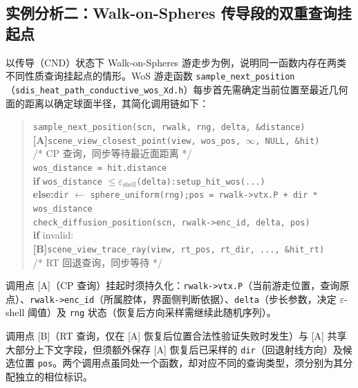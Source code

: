 \subsection{实例分析二：Walk-on-Spheres 传导段的双重查询挂起点}

以传导（CND）状态下 Walk-on-Spheres 游走步为例，说明同一函数内存在两类不同性质查询挂起点的情形。WoS 游走函数 \texttt{sample\_next\_position}（\texttt{sdis\_heat\_path\_conductive\_wos\_Xd.h}）每步首先需确定当前位置至最近几何面的距离以确定球面半径，其简化调用链如下：

\begin{quote}\small
\texttt{sample\_next\_position(scn, rwalk, rng, delta, \&distance)}\\
\hspace*{1.5em}\textbf{[A]}\;\texttt{scene\_view\_closest\_point(view,\,wos\_pos,\,$\infty$,\,NULL,\,\&hit)}\\
\hspace*{3em}/* CP 查询，同步等待最近面距离 */\\
\hspace*{1.5em}\texttt{wos\_distance = hit.distance}\\
\hspace*{1.5em}\textbf{if} \texttt{wos\_distance} $\leq\varepsilon_\text{shell}$\texttt{(delta):}\quad\texttt{setup\_hit\_wos(...)}\\
\hspace*{1.5em}\textbf{else:}\quad\texttt{dir} $\leftarrow$ \texttt{sphere\_uniform(rng);\quad pos = rwalk->vtx.P + dir * wos\_distance}\\
\hspace*{3em}\texttt{check\_diffusion\_position(scn, rwalk->enc\_id, delta, pos)}\\
\hspace*{3em}\textbf{if} invalid:\\
\hspace*{4.5em}\textbf{[B]}\;\texttt{scene\_view\_trace\_ray(view,\,rt\_pos,\,rt\_dir,\,...,\,\&hit\_rt)}\\
\hspace*{6em}/* RT 回退查询，同步等待 */
\end{quote}

调用点 [A]（CP 查询）挂起时须持久化：\texttt{rwalk->vtx.P}（当前游走位置，查询原点）、\texttt{rwalk->enc\_id}（所属腔体，界面侧判断依据）、\texttt{delta}（步长参数，决定 $\varepsilon$-shell 阈值）及 \texttt{rng} 状态（恢复后方向采样需继续此随机序列）。

调用点 [B]（RT 查询，仅在 [A] 恢复后位置合法性验证失败时发生）与 [A] 共享大部分上下文字段，但须额外保存 [A] 恢复后已采样的 \texttt{dir}（回退射线方向）及候选位置 \texttt{pos}。两个调用点虽同处一个函数，却对应不同的查询类型，须分别为其分配独立的相位标识。

